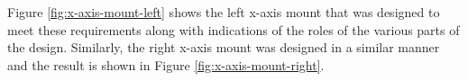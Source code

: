 Figure \ref{fig:x-axis-mount-left} shows the left x-axis mount that was designed to meet these requirements along with indications of the roles of the various parts of the design. Similarly, the right x-axis mount was designed in a similar manner and the result is shown in Figure \ref{fig:x-axis-mount-right}.




%

